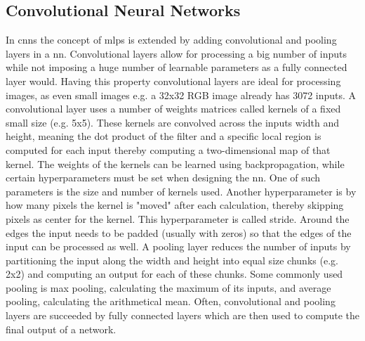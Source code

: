 \subsection{Convolutional Neural Networks}
In \ac{cnn}s the concept of \ac{mlp}s is extended by adding convolutional and pooling layers in a \ac{nn}. Convolutional layers allow for processing a big number of inputs while not imposing a huge number of learnable parameters as a fully connected layer would. Having this property convolutional layers are ideal for processing images, as even small images e.g. a 32x32 RGB image already has 3072 inputs.
A convolutional layer uses a number of weights matrices called kernels of a fixed small size (e.g. 5x5). These kernels are convolved across the inputs width and height, meaning the dot product of the filter and a specific local region is computed for each input thereby computing a two-dimensional map of that kernel. The weights of the kernels can be learned using backpropagation, while certain hyperparameters must be set when designing the \ac{nn}. One of such parameters is the size and number of kernels used. Another hyperparameter is by how many pixels the kernel is "moved" after each calculation, thereby skipping pixels as center for the kernel. This hyperparameter is called stride. Around the edges the input needs to be padded (usually with zeros) so that the edges of the input can be processed as well.
A pooling layer reduces the number of inputs by partitioning the input along the width and height into equal size chunks (e.g. 2x2) and computing an output for each of these chunks. Some commonly used pooling is max pooling, calculating the maximum of its inputs, and average pooling, calculating the arithmetical mean.
Often, convolutional and pooling layers are succeeded by fully connected layers which are then used to compute the final output of a network.




%

